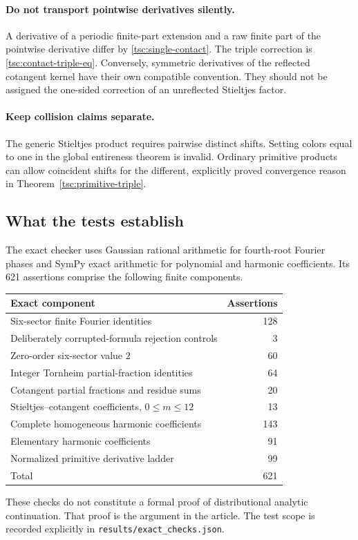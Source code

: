 \documentclass[11pt]{article}
\numberwithin{equation}{section}
\theoremstyle{definition}\newtheorem{definition}[theorem]{Definition}
\theoremstyle{remark}\newtheorem{remark}[theorem]{Remark}
\newcommand{\src}[1]{\nolinkurl{#1}}
\begin{document}
\paragraph{Do not transport pointwise derivatives silently.}
A derivative of a periodic finite-part extension and a raw finite part of
the pointwise derivative differ by \eqref{tsc:single-contact}. The triple
correction is \eqref{tsc:contact-triple-eq}. Conversely, symmetric derivatives
of the reflected cotangent kernel have their own compatible convention.
They should not be assigned the one-sided correction of an unreflected
Stieltjes factor.

\paragraph{Keep collision claims separate.}
The generic Stieltjes product requires pairwise distinct shifts. Setting
colors equal to one in the global entireness theorem is invalid. Ordinary
primitive products can allow coincident shifts for the different,
explicitly proved convergence reason in Theorem~\ref{tsc:primitive-triple}.

\subsection{What the tests establish}
The exact checker uses Gaussian rational arithmetic for fourth-root Fourier
phases and SymPy exact arithmetic for polynomial and harmonic coefficients.
Its 621 assertions comprise the following finite components.
\begin{center}
\begin{tabular}{lr}
\toprule
Exact component & Assertions\\\midrule
Six-sector finite Fourier identities & 128\\
Deliberately corrupted-formula rejection controls & 3\\
Zero-order six-sector value $2$ & 60\\
Integer Tornheim partial-fraction identities & 64\\
Cotangent partial fractions and residue sums & 20\\
Stieltjes--cotangent coefficients, $0\le m\le12$ & 13\\
Complete homogeneous harmonic coefficients & 143\\
Elementary harmonic coefficients & 91\\
Normalized primitive derivative ladder & 99\\\midrule
Total & 621\\\bottomrule
\end{tabular}
\end{center}
These checks do not constitute a formal proof of distributional analytic
continuation. That proof is the argument in the article. The test scope is
recorded explicitly in \src{results/exact_checks.json}.
\end{document}
